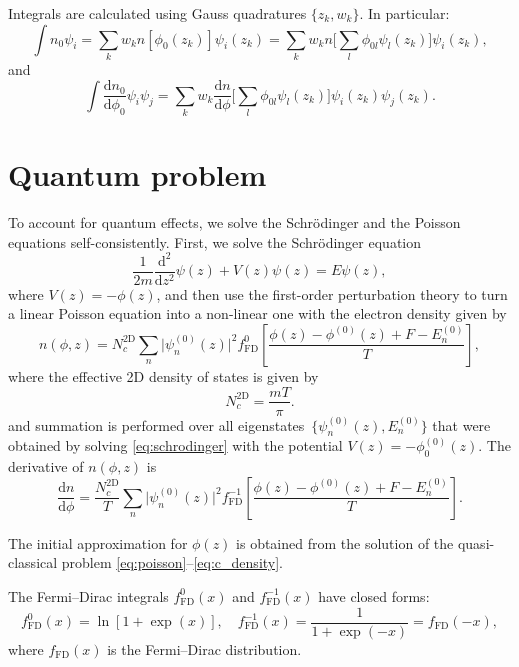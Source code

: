 \documentclass[10pt]{article}
\newcommand{\dd}{\mathrm{d}}
\newcommand{\fFD}{f_{\mathrm{FD}}}
\begin{document}
Integrals are calculated using Gauss quadratures $\{z_k, w_k\}$. In particular:
\begin{equation}
	\int n_0 \psi_i = \sum_k w_k n[\phi_0(z_k)] \psi_i(z_k)
	= \sum_k w_k n\Big[ \sum_l \phi_{0l} \psi_l(z_k) \Big] \psi_i(z_k),
\end{equation}
and
\begin{equation}
	\int \frac{\dd n_0}{\dd \phi_0} \psi_i \psi_j
	= \sum_k w_k \frac{\dd n}{\dd \phi}
		\Big[ \sum_l \phi_{0l} \psi_l(z_k) \Big] \psi_i(z_k) \psi_j(z_k).
\end{equation}

\section{Quantum problem}

To account for quantum effects, we solve the Schr\"odinger and the Poisson
equations self-consistently. First, we solve the Schr\"odinger equation
\begin{equation}
	\label{eq:schrodinger}
	\frac{1}{2m} \frac{\dd^2}{\dd z^2} \psi(z) + V(z) \psi(z) = E \psi(z),
\end{equation}
where $V(z) = -\phi(z)$, and then use the first-order perturbation theory to turn a
linear Poisson equation into a non-linear one with the electron density given by
\begin{equation}
	n(\phi, z) = N_c^\mathrm{2D} \sum_n \lvert\psi_n^{(0)}(z)\rvert^2 \fFD^0
				 \left[ \frac{\phi(z) - \phi^{(0)}(z) + F - E_n^{(0)}}{T} \right],
\end{equation}
where the effective 2D density of states is given by
\begin{equation}
	N_c^\mathrm{2D} = \frac{m T}{\pi}.
\end{equation}
and summation is performed over all eigenstates~$\{ \psi_n^{(0)}(z), E_n^{(0)} \}$
that were obtained by solving \eqref{eq:schrodinger} with the potential
$V(z) = -\phi_0^{(0)}(z)$. The derivative of $n(\phi, z)$ is
\begin{equation}
	\frac{\dd n}{\dd \phi} =
		\frac{N_c^\mathrm{2D}}{T} \sum_n \lvert\psi_n^{(0)}(z)\rvert^2 \fFD^{-1}
		\left[ \frac{\phi(z) - \phi^{(0)}(z) + F - E_n^{(0)}}{T} \right].
\end{equation}

The initial approximation for $\phi(z)$ is obtained from the solution of the
quasi-classical problem \eqref{eq:poisson}--\eqref{eq:c_density}.

The Fermi--Dirac integrals $\fFD^0(x)$ and $\fFD^{-1}(x)$ have closed forms:
\begin{equation}
	\fFD^0(x) = \ln[ 1 + \exp(x) ], \quad
	\fFD^{-1}(x) = \frac{1}{1 + \exp(-x)} = f_{\mathrm{FD}}(-x),
\end{equation}
where $f_{\mathrm{FD}}(x)$ is the Fermi--Dirac distribution.
\end{document}
